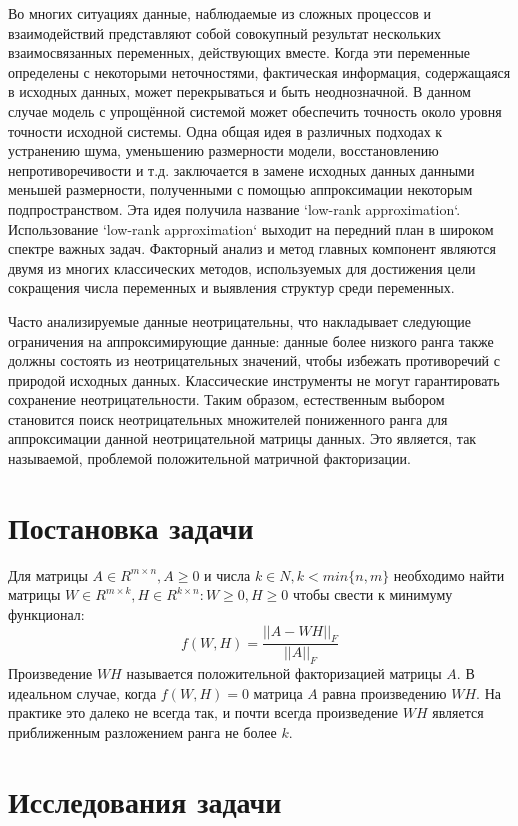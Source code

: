 \documentclass[14pt]{extarticle}
\begin{document}
Во многих ситуациях данные, наблюдаемые из сложных процессов и взаимодействий представляют собой совокупный результат нескольких взаимосвязанных переменных, действующих вместе. Когда эти переменные определены с некоторыми неточностями, фактическая информация, содержащаяся в исходных данных, может перекрываться и быть неоднозначной. В данном случае модель с упрощённой системой может обеспечить точность около уровня точности исходной системы. Одна общая идея в различных подходах к устранению шума, уменьшению размерности модели, восстановлению непротиворечивости и т.д. заключается в замене исходных данных данными меньшей размерности, полученными с помощью аппроксимации некоторым подпространством. Эта идея получила название `low-rank approximation`. Использование `low-rank approximation` выходит на передний план в широком спектре важных задач. Факторный анализ и метод главных компонент являются двумя из многих классических методов, используемых для достижения цели сокращения числа переменных и выявления структур среди переменных.

Часто анализируемые данные неотрицательны, что накладывает следующие ограничения на аппроксимирующие данные: данные более низкого ранга также должны состоять из неотрицательных значений, чтобы избежать противоречий с природой исходных данных. Классические инструменты не могут гарантировать сохранение неотрицательности. Таким образом, естественным выбором становится поиск неотрицательных множителей пониженного ранга для аппроксимации данной неотрицательной матрицы данных. Это является, так называемой, проблемой положительной матричной факторизации.

\newpage


\section{Постановка задачи}

Для матрицы $A \in R^{m \times n}, A \geq 0$ и числа $k \in N, k < min\{n, m\}$ необходимо найти матрицы $W \in R^{m \times k}, H \in R^{k \times n} : W \geq 0, H \geq 0$ чтобы свести к минимуму функционал:
$$
f(W, H) = \dfrac{||A - WH||_F}{|| A ||_F}
$$
Произведение $WH$ называется положительной факторизацией матрицы $A$. В идеальном случае, когда $f(W,H) = 0$ матрица $A$ равна произведению $WH$. На практике это далеко не всегда так, и почти всегда произведение $WH$ является приближенным разложением ранга не более $k$.


\newpage


\section{Исследования задачи}
\end{document}

